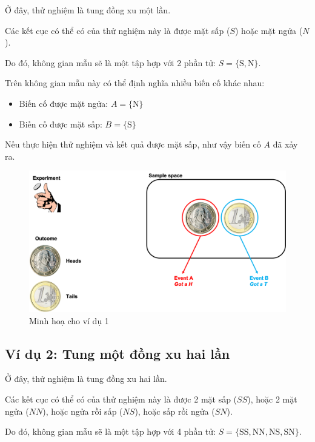 \documentclass[
]{book}
\providecommand{\tightlist}{%
  \setlength{\itemsep}{0pt}\setlength{\parskip}{0pt}}
\begin{document}
Ở đây, thử nghiệm là tung đồng xu một lần.

Các kết cục có thể có của thử nghiệm này là được mặt sấp (\(S\)) hoặc mặt ngửa (\(N\)).

Do đó, không gian mẫu sẽ là một tập hợp với 2 phần tử: \(S = \{\text{S},\text{N} \}\).

Trên không gian mẫu này có thể định nghĩa nhiều biến cố khác nhau:

\begin{itemize}
\tightlist
\item
  Biến cố được mặt ngửa: \(A = \{\text{N}\}\)
\item
  Biến cố được mặt sấp: \(B = \{\text{S}\}\)
\end{itemize}

Nếu thực hiện thử nghiệm và kết quả được mặt sấp, như vậy biến cố \(A\) đã xảy ra.

\begin{figure}
\includegraphics[width=25.39in]{figures/Picture01} \caption{Minh hoạ cho ví dụ 1}\label{fig:example1}
\end{figure}

\hypertarget{vuxed-dux1ee5-2-tung-mux1ed9t-ux111ux1ed3ng-xu-hai-lux1ea7n}{%
\subsection{Ví dụ 2: Tung một đồng xu hai lần}\label{vuxed-dux1ee5-2-tung-mux1ed9t-ux111ux1ed3ng-xu-hai-lux1ea7n}}

Ở đây, thử nghiệm là tung đồng xu hai lần.

Các kết cục có thể có của thử nghiệm này là được 2 mặt sấp (\(SS\)), hoặc 2 mặt ngửa (\(NN\)), hoặc ngửa rồi sấp (\(NS\)), hoặc sấp rồi ngửa (\(SN\)).

Do đó, không gian mẫu sẽ là một tập hợp với 4 phần tử: \(S = \{\text{SS},\text{NN},\text{NS},\text{SN}\}\).
\end{document}
